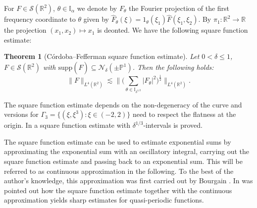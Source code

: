 \documentclass{amsart}
\newtheorem{theorem}{Theorem}[section]
\theoremstyle{definition}
\newcommand{\R}{\mathbb{R}}
\begin{document}
For $F \in \mathcal{S}(\R^2)$, $\theta \in \mathbb{I}_{\alpha}$ we denote by $F_{\theta}$ the Fourier projection  of the first frequency coordinate to $\theta$ given by $\hat{F}_{\theta}(\xi) = 1_{\theta}(\xi_1) \hat{F}(\xi_1,\xi_2)$. By $\pi_1 : \R^2 \to \R$ the projection $(x_1,x_2) \mapsto x_1$ is deonted. We have the following square function estimate:
\begin{theorem}[C\'ordoba--Fefferman square function estimate]
Let $0<\delta \leq 1$, $F \in \mathcal{S}(\R^2)$ with $\text{supp}(\hat{F}) \subseteq \mathcal{N}_{\delta}(\pm \mathbb{P}^1)$. Then the following holds:
\begin{equation*}
\| F \|_{L^4(\R^2)} \lesssim \big\| \big( \sum_{\theta \in \mathbb{I}_{\delta^{1/2}}} |F_{\theta}|^2 \big)^{\frac{1}{2}} \big\|_{L^4(\R^2)}.
\end{equation*}
\end{theorem}
The square function estimate depends on the non-degeneracy of the curve and versions for $\Gamma_3 = \{ (\xi,\xi^3) : \xi \in (-2,2) \}$ need to respect the flatness at the origin. In \cite[Theorem~2.2]{Schippa2025Quasiperiodic} a square function estimate with $\delta^{1/3}$-intervals is proved.

The square function estimate can be used to estimate exponential sums by approximating the exponential sum with an oscillatory integral, carrying out the square function estimate and passing back to an exponential sum. This will be referred to as continuous approximation in the following. To the best of the author's knowledge, this approximation was first carried out by Bourgain \cite{Bourgain2013}.
In \cite[Section~3.1]{Schippa2025Quasiperiodic} was pointed out how the square function estimate together with the continuous approximation yields sharp estimates for quasi-periodic functions. 

\smallskip
\end{document}

